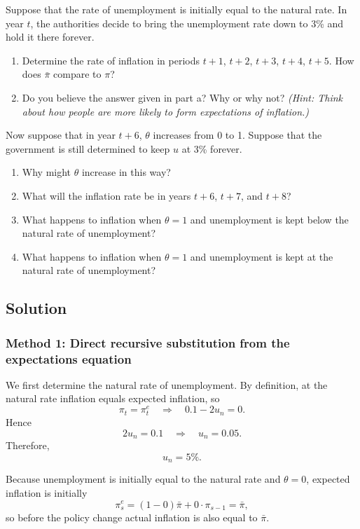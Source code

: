 \documentclass[12pt]{article}
\begin{document}
Suppose that the rate of unemployment is initially equal to the natural rate. In year \(t\), the authorities decide to bring the unemployment rate down to 3\% and hold it there forever.
\begin{enumerate}[label=(\alph*)]
    \item Determine the rate of inflation in periods \(t+1\), \(t+2\), \(t+3\), \(t+4\), \(t+5\). How does \(\bar{\pi}\) compare to \(\pi\)?
    \item Do you believe the answer given in part a? Why or why not? \emph{(Hint: Think about how people are more likely to form expectations of inflation.)}
\end{enumerate}

Now suppose that in year \(t+6\), \(\theta\) increases from 0 to 1. Suppose that the government is still determined to keep \(u\) at 3\% forever.
\begin{enumerate}[label=(\alph*),start=3]
    \item Why might \(\theta\) increase in this way?
    \item What will the inflation rate be in years \(t+6\), \(t+7\), and \(t+8\)?
    \item What happens to inflation when \(\theta=1\) and unemployment is kept below the natural rate of unemployment?
    \item What happens to inflation when \(\theta=1\) and unemployment is kept at the natural rate of unemployment?
\end{enumerate}

\newpage
\subsection{Solution}

\subsubsection{Method 1: Direct recursive substitution from the expectations equation}
We first determine the natural rate of unemployment. By definition, at the natural rate inflation equals expected inflation, so
\[
\pi_t=\pi_t^e
\quad\Longrightarrow\quad
0.1-2u_n=0.
\]
Hence
\[
2u_n=0.1
\quad\Longrightarrow\quad
u_n=0.05.
\]
Therefore,
\[
\boxed{u_n=5\%.}
\]

Because unemployment is initially equal to the natural rate and \(\theta=0\), expected inflation is initially
\[
\pi_s^e=(1-0)\bar{\pi}+0\cdot \pi_{s-1}=\bar{\pi},
\]
so before the policy change actual inflation is also equal to \(\bar{\pi}\).
\end{document}
